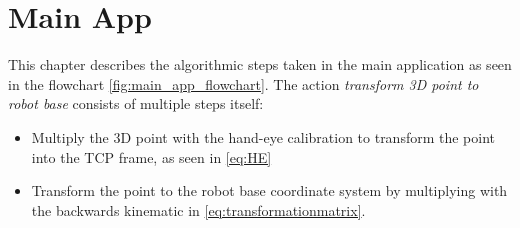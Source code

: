 \documentclass[./\jobname.tex]{subfiles}
\begin{document}
\begin{table}[h]
	\centering
	\noindent{}
	\label{tab:laser_template_comp}
\end{table}


\chapter{Main App}
This chapter describes the algorithmic steps taken in the main application as seen in the flowchart \ref{fig:main_app_flowchart}. The action \textit{transform 3D point to robot base} consists of multiple steps itself: 

\begin{itemize}
	\item Multiply the 3D point with the hand-eye calibration to transform the point into the TCP frame, as seen in \ref{eq:HE} 
	\item Transform the point to the robot base coordinate system by multiplying with the backwards kinematic in \ref{eq:transformationmatrix}. 
\end{itemize}
\end{document}
